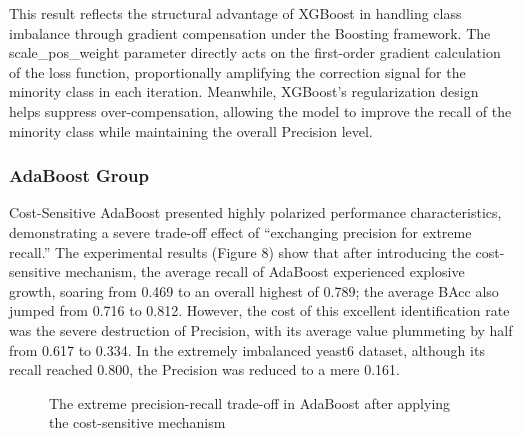\documentclass[sigconf]{acmart}
\begin{document}
This result reflects the structural advantage of XGBoost in handling class imbalance through gradient compensation under the Boosting framework. The scale\_pos\_weight parameter directly acts on the first-order gradient calculation of the loss function, proportionally amplifying the correction signal for the minority class in each iteration. Meanwhile, XGBoost's regularization design helps suppress over-compensation, allowing the model to improve the recall of the minority class while maintaining the overall Precision level. 

\subsubsection{AdaBoost Group}

Cost-Sensitive AdaBoost presented highly polarized performance characteristics, demonstrating a severe trade-off effect of ``exchanging precision for extreme recall.'' The experimental results (Figure 8) show that after introducing the cost-sensitive mechanism, the average recall of AdaBoost experienced explosive growth, soaring from 0.469 to an overall highest of 0.789; the average BAcc also jumped from 0.716 to 0.812. However, the cost of this excellent identification rate was the severe destruction of Precision, with its average value plummeting by half from 0.617 to 0.334. In the extremely imbalanced yeast6 dataset, although its recall reached 0.800, the Precision was reduced to a mere 0.161.

\begin{figure}[h]
    \centering
    \caption{The extreme precision-recall trade-off in AdaBoost after applying the cost-sensitive mechanism}
    \label{fig:adaboost_tradeoff}
\end{figure}
\end{document}
